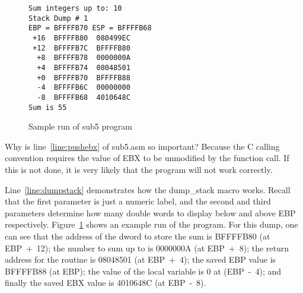 
\begin{figure}[t]
\begin{Verbatim}[frame=single]
Sum integers up to: 10
Stack Dump # 1
EBP = BFFFFB70 ESP = BFFFFB68
 +16  BFFFFB80  080499EC
 +12  BFFFFB7C  BFFFFB80
  +8  BFFFFB78  0000000A
  +4  BFFFFB74  08048501
  +0  BFFFFB70  BFFFFB88
  -4  BFFFFB6C  00000000
  -8  BFFFFB68  4010648C
Sum is 55
\end{Verbatim}
\caption{Sample run of sub5 program \label{fig:dumpstack}}
\end{figure}

Why is line~\ref{line:pushebx} of {\code sub5.asm} so important?
Because the C calling convention requires the value of EBX to be
unmodified by the function call. If this is not done, it is very
likely that the program will not work correctly.

Line~\ref{line:dumpstack} demonstrates how the {\code dump\_stack} macro
works. Recall that the first parameter is just a numeric label, and the
second and third parameters determine how many double words to display below
and above EBP respectively. Figure~\ref{fig:dumpstack} shows an example run
of the program. For this dump, one can see that the address of the dword
to store the sum is BFFFFB80 (at EBP~+~12); the number to sum up to is 0000000A
(at EBP~+~8); the return address for the routine is 08048501 (at EBP~+~4);
the saved EBP value is BFFFFB88 (at EBP); the value of the local variable is
0 at (EBP~-~4); and finally the saved EBX value is 4010648C (at EBP~-~8).

